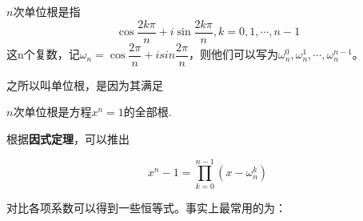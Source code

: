                \begin{definition}
                    $n$次单位根是指
                    \begin{equation}
                        \label{eq:unit_root}
                        \cos\frac{2k\pi}n+i\sin\frac{2k\pi}n, k=0,1,\cdots,n-1
                        \nonumber
                    \end{equation}
                    这n个复数，记$\omega_n=\cos\dfrac{2\pi}n+isin\dfrac{2\pi}n$，则他们可以写为$\omega_n^{0},\omega_n^{1},\cdots,\omega_n^{n-1}$。
                \end{definition}

                之所以叫单位根，是因为其满足

                \begin{proposition}[单位根的性质]
                    $n$次单位根是方程$x^n=1$的全部根.
                \end{proposition}

                根据\textbf{因式定理}，可以推出

                \begin{equation}
                    \label{eq:unit_root_factor}
                    x^n-1=\prod_{k=0}^{n-1}(x-\omega_n^{k})
                    \nonumber
                \end{equation}

                对比各项系数可以得到一些恒等式。事实上最常用的为：

